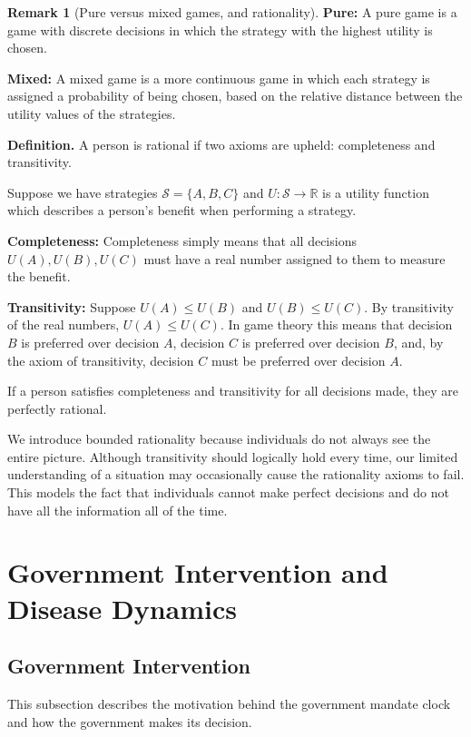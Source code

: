 \documentclass[11pt]{article}
\theoremstyle{definition}
\newtheorem{remark}{Remark}[section]
\theoremstyle{plain}
\begin{document}
\begin{remark}[Pure versus mixed games, and rationality]
\label{rem:rational}
\textbf{Pure:} A pure game is a game with discrete decisions in which the strategy with the highest utility is chosen.

\textbf{Mixed:} A mixed game is a more continuous game in which each strategy is assigned a probability of being chosen, based on the relative distance between the utility values of the strategies.

\textbf{Definition.} A person is rational if two axioms are upheld: completeness and transitivity.

Suppose we have strategies $\mathcal{S} = \{A,B,C\}$ and $U: \mathcal{S} \rightarrow \mathbb{R}$ is a utility function which describes a person's benefit when performing a strategy.

\textbf{Completeness:} Completeness simply means that all decisions $U(A), U(B), U(C)$ must have a real number assigned to them to measure the benefit.

\textbf{Transitivity:} Suppose $U(A) \leq U(B)$ and $U(B) \leq U(C)$. By transitivity of the real numbers, $U(A) \leq U(C)$. In game theory this means that decision $B$ is preferred over decision $A$, decision $C$ is preferred over decision $B$, and, by the axiom of transitivity, decision $C$ must be preferred over decision $A$.

If a person satisfies completeness and transitivity for all decisions made, they are perfectly rational.

We introduce bounded rationality because individuals do not always see the entire picture. Although transitivity should logically hold every time, our limited understanding of a situation may occasionally cause the rationality axioms to fail. This models the fact that individuals cannot make perfect decisions and do not have all the information all of the time.
\end{remark}


\section{Government Intervention and Disease Dynamics}
\label{sec:gov-disease}

\subsection{Government Intervention}
\label{sec:gov}

This subsection describes the motivation behind the government mandate clock and how the government makes its decision.
\end{document}
